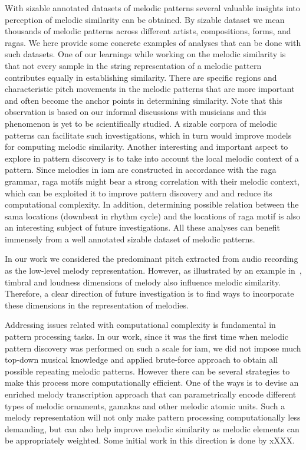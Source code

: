 With sizable annotated datasets of melodic patterns several valuable insights into perception of melodic similarity can be obtained. By sizable dataset we mean thousands of melodic patterns across different artists, compositions, forms, and \glspl{raga}. We here provide some concrete examples of analyses that can be done with such datasets. One of our learnings while working on the melodic similarity is that not every sample in the string representation of a melodic pattern contributes equally in establishing similarity. There are specific regions and characteristic pitch movements in the melodic patterns that are more important and often become the anchor points in determining similarity. Note that this observation is based on our informal discussions with musicians and this phenomenon is yet to be scientifically studied. A sizable corpora of melodic patterns can facilitate such investigations, which in turn would improve models for computing melodic similarity. Another interesting and important aspect to explore in pattern discovery is to take into account the local melodic context of a pattern. Since melodies in \gls{iam} are constructed in accordance with the \gls{raga} grammar, \gls{raga} motifs might bear a strong correlation with their melodic context, which can be exploited it to improve pattern discovery and and reduce its computational complexity. In addition, determining possible relation between the \gls{sama} locations (downbeat in rhythm cycle) and the locations of \gls{raga} motif is also an interesting subject of future investigations. All these analyses can benefit immensely from a well annotated sizable dataset of melodic patterns. 

In our work we considered the predominant pitch extracted from audio recording as the low-level melody representation. However, as illustrated by an example in~, timbral and loudness dimensions of melody also influence melodic similarity. Therefore, a clear direction of future investigation is to find ways to incorporate these dimensions in the representation of melodies.

Addressing issues related with computational complexity is fundamental in pattern processing tasks. In our work, since it was the first time when melodic pattern discovery was performed on such a scale for \gls{iam}, we did not impose much top-down musical knowledge and applied brute-force approach to obtain all possible repeating melodic patterns. However there can be several strategies to make this process more computationally efficient. One of the ways is to devise an enriched melody transcription approach that can parametrically encode different types of melodic ornaments, \glspl{gamaka} and other melodic atomic units. Such a melody representation will not only make pattern processing computationally less demanding, but can also help improve melodic similarity as melodic elements can be appropriately weighted. Some initial work in this direction is done by xXXX.

